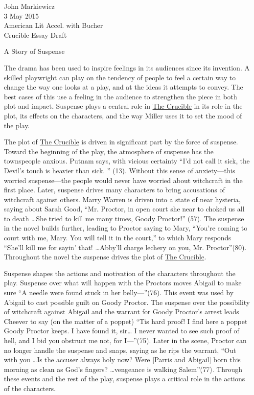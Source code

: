 \documentclass[12pt]{article}
\begin{document}
\begin{raggedleft}
	John Markiewicz \\
	3 May 2015 \\
	American Lit Accel. with Bucher \\
	Crucible Essay Draft \\
\end{raggedleft}
\begin{center}
A Story of Suspense
\end{center}

\doublespacing

	The drama has been used to inspire feelings in its audiences since its 
	invention.  A skilled playwright can play on the tendency of people to feel
	a certain way to change the way one looks at a play, and at the ideas it
	attempts to convey.  The best cases of this use a feeling in the audience to
	strengthen the piece in both plot and impact.  Suspense plays a central role
	in \underline{The Crucible} in its role in the plot, its effects on the
	characters, and the way Miller uses it to set the mood of the play.

	The plot of \underline{The Crucible} is driven in significant part by the 
	force of suspense.  Toward the beginning of the play, the atmosphere of
	suspense has the townspeople anxious.  Putnam says, with vicious
	certainty ``I'd not call it sick, the Devil's touch is heavier than sick.
	{''} (13).  Without this sense of anxiety---this worried suspense---the 
	people would never have worried about witchcraft in the first place.  Later,
	suspense drives many characters to bring accusations of witchcraft against 
	others.  Marry Warren is driven into a state of near hysteria, saying about 
	Sarah Good, ``Mr. Proctor, in open court she near to choked us all to death 
	\ldots She tried to	kill me many times, Goody Proctor!'' (57).  The suspense 
	in the novel builds further, leading to Proctor saying to Mary, ``You're 
	coming to court with me, Mary.  You will tell it in the court,'' to which Mary
	responds ``She'll kill me for sayin' that! \ldots Abby'll charge lechery on 
	you, Mr. Proctor''(80).	Throughout the novel the suspense drives the plot of 
	\underline{The Crucible}.

	Suspense shapes the actions and motivation of the characters throughout the 
	play.  Suspense over what will happen with the Proctors moves Abigail to 
	make sure ``A needle were found stuck in her belly---''(76).  This event was 
	used by Abigail to cast possible guilt on Goody Proctor.  The suspense
	over the possibility of witchcraft against Abigail and the warrant for Goody
	Proctor's arrest leads Cheever to say (on the matter of a poppet) ``Tis hard 
	proof!  I find here a poppet Goody Proctor keeps.  I have found it, sir\ldots
	I never wanted to see such proof of hell, and I bid you obstruct me not, for 
	I---''(75).  Later in the scene, Proctor can no longer handle the suspense and
	snaps, saying as he rips the warrant, ``Out with you \ldots Is the accuser 
	always holy now?  Were [Parris and Abigail] born this morning as clean as
	God's fingers? \ldots vengeance is walking Salem''(77).  Through these events
	and the rest of the play, suspense plays a critical role in the actions of
	the characters.
\end{document}
